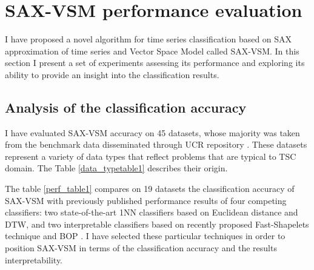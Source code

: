 \section{SAX-VSM performance evaluation} \label{results}
I have proposed a novel algorithm for time series classification based on SAX approximation of time series and 
Vector Space Model called SAX-VSM. In this section I present a set of experiments assessing its performance 
and exploring its ability to provide an insight into the classification results.

\subsection{Analysis of the classification accuracy}
I have evaluated SAX-VSM accuracy on 45 datasets, whose majority was taken from the benchmark data disseminated 
through UCR repository \cite{ucr}. These datasets represent a variety of data types that reflect problems that 
are typical to TSC domain. The Table \ref{data_typetable1} describes their origin.

The table \ref{perf_table1} compares on 19 datasets the classification accuracy of \mbox{SAX-VSM} with 
previously published performance results of four competing classifiers: 
two state-of-the-art 1NN classifiers based on Euclidean distance and DTW, 
and two interpretable classifiers based on recently proposed Fast-Shapelets technique \cite{citeulike:12563493} 
and BOP \cite{citeulike:10525778}.
I have selected these particular techniques in order to position \mbox{SAX-VSM} in terms of 
the classification accuracy and the results interpretability. 

